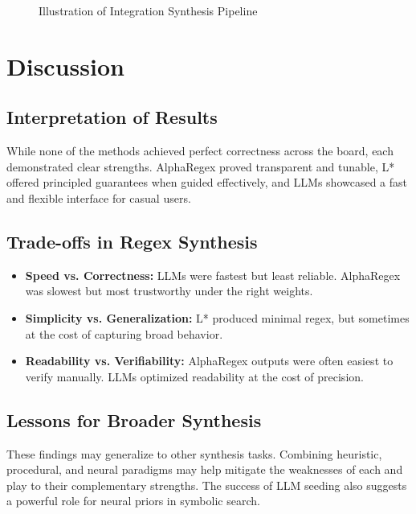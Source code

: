 \begin{figure}[h!]
\centering
{}
\caption{Illustration of Integration Synthesis Pipeline}
\end{figure}

\section{Discussion}

\subsection{Interpretation of Results}

\indent\indent While none of the methods achieved perfect correctness across the board, each demonstrated clear strengths. AlphaRegex proved transparent and tunable, L* offered principled guarantees when guided effectively, and LLMs showcased a fast and flexible interface for casual users.

\subsection{Trade-offs in Regex Synthesis}

\begin{itemize}
\item \textbf{Speed vs. Correctness:} LLMs were fastest but least reliable. AlphaRegex was slowest but most trustworthy under the right weights.
\item \textbf{Simplicity vs. Generalization:} L* produced minimal regex, but sometimes at the cost of capturing broad behavior.
\item \textbf{Readability vs. Verifiability:} AlphaRegex outputs were often easiest to verify manually. LLMs optimized readability at the cost of precision.
\end{itemize}

\subsection{Lessons for Broader Synthesis}

\indent\indent These findings may generalize to other synthesis tasks. Combining heuristic, procedural, and neural paradigms may help mitigate the weaknesses of each and play to their complementary strengths. The success of LLM seeding also suggests a powerful role for neural priors in symbolic search.

\vspace{2em}

